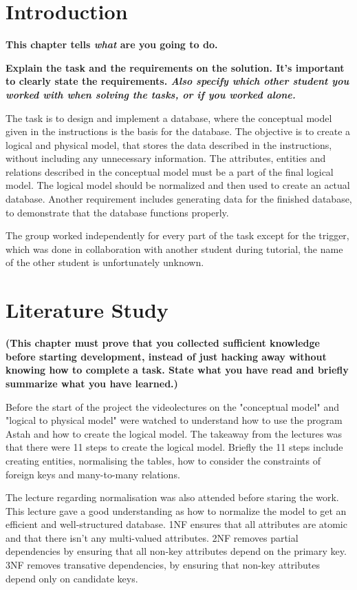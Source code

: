 \documentclass[a4paper]{scrartcl}
\begin{document}
\section{Introduction}

\textbf{This chapter tells \textit{what} are you going to do.} 

\textbf{Explain the task and the requirements on the solution. It's important to clearly state the requirements. \textit{Also specify which other student you worked with when solving the tasks, or if you worked alone.} }

The task is to design and implement a database, where the conceptual model given in the instructions is the basis for the database. The objective is to create a logical and physical model, that stores the data described in the instructions, without including any unnecessary information. The attributes, entities and relations described in the conceptual model must be a part of the final logical model. The logical model should be normalized and then used to create an actual database. Another requirement includes generating data for the finished database, to demonstrate that the database functions properly.

The group worked independently for every part of the task except for the trigger, which was done in collaboration with another student during tutorial, the name of the other student is unfortunately unknown. 


\section{Literature Study}
 
\textbf{(This chapter must prove that you collected sufficient knowledge before starting development, instead of just hacking away without knowing how to complete a task. State what you have read and briefly summarize what you have learned.)}

Before the start of the project the videolectures on the "conceptual model" and "logical to physical model" were watched to understand how to use the program Astah and how to create the logical model. The takeaway from the lectures was that there were 11 steps to create the logical model. Briefly the 11 steps include creating entities, normalising the tables, how to consider the constraints of foreign keys and many-to-many relations.

The lecture regarding normalisation was also attended before staring the work. This lecture gave a good understanding as how to normalize the model to get an efficient and well-structured database. 1NF ensures that all attributes are atomic and that there isn't any multi-valued attributes. 2NF removes partial dependencies by ensuring that all non-key attributes depend on the primary key. 3NF removes transative dependencies, by ensuring that non-key attributes depend only on candidate keys.  
\end{document}
